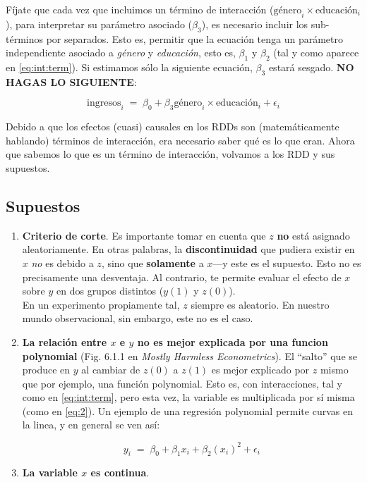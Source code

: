 \documentclass[10pt]{article}
\begin{document}
F\'ijate que cada vez que incluimos un t\'ermino de interacci\'on (${\text{g\'enero}}_{i}\times \text{educaci\'on}_{i}$), para interpretar su par\'ametro asociado ($\beta_{3}$), es necesario incluir los sub-t\'erminos por separados. Esto es, permitir que la ecuaci\'on tenga un par\'ametro independiente asociado a \emph{g\'enero} y \emph{educaci\'on}, esto es, $\beta_{1}$ y $\beta_{2}$ (tal y como aparece en \autoref{eq:int:term}). Si estimamos s\'olo la siguiente ecuaci\'on, $\beta_{3}$ estar\'a sesgado. {\bf NO HAGAS LO SIGUIENTE}:


		\begin{equation}\label{eq:int:term:mala}
			\text{ingresos}_{i} \;=\; \beta_{0} + \beta_{3}{\text{g\'enero}}_{i}\times \text{educaci\'on}_{i} + \epsilon_{i}
		\end{equation}

Debido a que los efectos (cuasi) causales en los RDDs son (matem\'aticamente hablando) t\'erminos de interacci\'on, era necesario saber qu\'e es lo que eran. Ahora que sabemos lo que es un t\'ermino de interacci\'on, volvamos a los RDD y sus supuestos.

\subsection*{Supuestos}

\begin{enumerate}
	\item {\bf Criterio de corte}. Es importante tomar en cuenta que $z$ {\bf no} est\'a asignado aleatoriamente. En otras palabras, la {\bf discontinuidad} que pudiera existir en $x$ \emph{no} es debido a $z$, sino que {\bf solamente} a $x$---y este es el supuesto. Esto no es precisamente una desventaja. Al contrario, te permite evaluar el efecto de $x$ sobre $y$ en dos grupos distintos ($y(1)$ y $z(0)$). 
	\\
	En un experimento propiamente tal, $z$ siempre es aleatorio. En nuestro mundo observacional, sin embargo, este no es el caso.

	\item {\bf La relaci\'on entre $x$ e $y$ no es mejor explicada por una funcion polynomial} (Fig. 6.1.1 en \emph{Mostly Harmless Econometrics}). El ``salto'' que se produce en $y$ al cambiar de $z(0)$ a $z(1)$ es mejor explicado por $z$ mismo que por ejemplo, una funci\'on polynomial. Esto es, con interacciones, tal y como en \autoref{eq:int:term}, pero esta vez, la variable es multiplicada por s\'i misma (como en \autoref{eq:2}). Un ejemplo de una regresi\'on polynomial permite curvas en la linea, y en general se ven as\'i:

		\begin{equation}\label{eq:2}
			y_{i} \;=\; \beta_{0} + \beta_{1}x_{i} + \beta_{2}(x_{i})^2 + \epsilon_{i}
		\end{equation}

	\item {\bf La variable $x$ es continua}. 
\end{enumerate}
\end{document}
